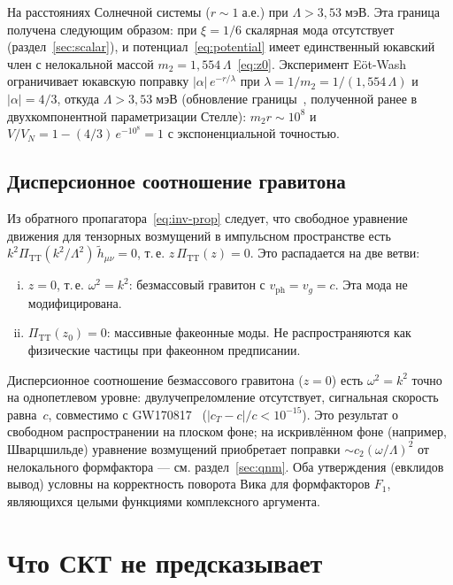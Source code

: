 \documentclass[12pt,a4paper]{article}
\theoremstyle{plain}
\theoremstyle{definition}
\theoremstyle{remark}
\begin{document}
На расстояниях Солнечной системы ($r \sim 1\;\text{а.е.}$) при
$\Lambda > 3{,}53\;\text{мэВ}$. Эта граница получена следующим
образом: при $\xi = 1/6$ скалярная мода отсутствует
(раздел~\ref{sec:scalar}), и потенциал~\eqref{eq:potential} имеет
единственный юкавский член с нелокальной массой
$m_2 = 1{,}554\,\Lambda$~\eqref{eq:z0}.
Эксперимент Eöt-Wash~\cite{Kapner:2007} ограничивает юкавскую
поправку $|\alpha|\,e^{-r/\lambda}$ при
$\lambda = 1/m_2 = 1/(1{,}554\,\Lambda)$ и $|\alpha| = 4/3$,
откуда $\Lambda > 3{,}53\;\text{мэВ}$
(обновление границы~\cite{Alfyorov:2026paper2}, полученной ранее в
двухкомпонентной параметризации Стелле):
$m_2 r \sim 10^8$ и
$V/V_N = 1 - (4/3)\,e^{-10^8} = 1$ с экспоненциальной точностью.

\subsection{Дисперсионное соотношение гравитона}
\label{sec:dispersion}

Из обратного пропагатора~\eqref{eq:inv-prop} следует, что
свободное уравнение движения для тензорных возмущений в
импульсном пространстве есть
$k^2 \Pi_{\mathrm{TT}}(k^2/\Lambda^2)\, \tilde{h}_{\mu\nu} = 0$,
т.\,е. $z\, \Pi_{\mathrm{TT}}(z) = 0$. Это распадается на две ветви:
\begin{enumerate}[(i)]
\item $z = 0$, т.\,е. $\omega^2 = k^2$: безмассовый гравитон
  с $v_{\mathrm{ph}} = v_g = c$. Эта мода не модифицирована.
\item $\Pi_{\mathrm{TT}}(z_0) = 0$: массивные факеонные моды.
  Не распространяются как физические частицы при факеонном
  предписании.
\end{enumerate}

Дисперсионное соотношение безмассового гравитона ($z = 0$)
есть $\omega^2 = k^2$ точно на однопетлевом уровне:
двулучепреломление отсутствует, сигнальная скорость
равна~$c$, совместимо с GW170817~\cite{GW170817:2017}
($|c_T - c|/c < 10^{-15}$). Это результат о свободном
распространении на плоском фоне; на искривлённом фоне
(например, Шварцшильде) уравнение возмущений приобретает
поправки $\sim c_2 (\omega/\Lambda)^2$ от нелокального
формфактора --- см. раздел~\ref{sec:qnm}. Оба утверждения
(евклидов вывод) условны на корректность поворота
Вика для формфакторов $F_1$, являющихся целыми функциями
комплексного аргумента.

\section{Что СКТ не предсказывает}
\label{sec:negative}
\end{document}
